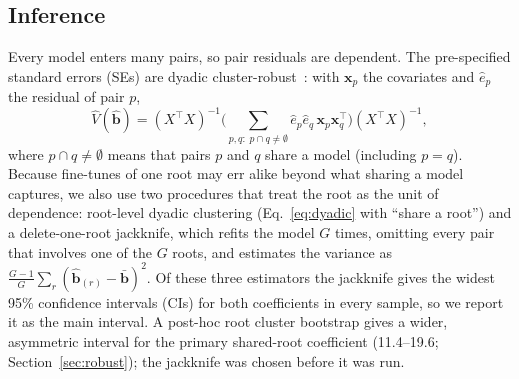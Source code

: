 \documentclass{ieeeaccess}
\theoremstyle{definition}
\theoremstyle{plain}
\begin{document}
\subsection{Inference}
Every model enters many pairs, so pair residuals are dependent. The pre-specified standard errors (SEs) are dyadic cluster-robust~\cite{fafchamps2007,cameron2011,aronow2015}: with $\mathbf{x}_p$ the covariates and $\hat e_p$ the residual of pair $p$,
\begin{equation}
\widehat{V}(\hat{\mathbf{b}}) = (X^\top X)^{-1}\Big(\sum_{p,q:\;p \cap q \neq \emptyset} \hat e_p \hat e_q\, \mathbf{x}_p \mathbf{x}_q^\top\Big)(X^\top X)^{-1},
\label{eq:dyadic}
\end{equation}
where $p \cap q \neq \emptyset$ means that pairs $p$ and $q$ share a model (including $p = q$). Because fine-tunes of one root may err alike beyond what sharing a model captures, we also use two procedures that treat the root as the unit of dependence: root-level dyadic clustering (Eq.~\eqref{eq:dyadic} with ``share a root'') and a delete-one-root jackknife, which refits the model $G$ times, omitting every pair that involves one of the $G$ roots, and estimates the variance as $\frac{G-1}{G}\sum_{r} (\hat{\mathbf{b}}_{(r)} - \bar{\mathbf{b}})^2$. Of these three estimators the jackknife gives the widest 95\% confidence intervals (CIs) for both coefficients in every sample, so we report it as the main interval. A post-hoc root cluster bootstrap gives a wider, asymmetric interval for the primary shared-root coefficient (11.4--19.6; Section~\ref{sec:robust}); the jackknife was chosen before it was run.
\end{document}
